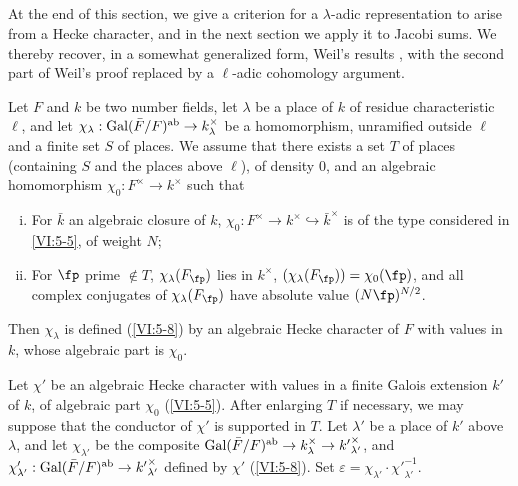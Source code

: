 \subsection{}\label{VI:5-9}

At the end of this section, we give a criterion for a 
$\lambda$-adic representation to arise from a Hecke character, 
and in the next section we apply it to Jacobi sums. We 
thereby recover, in a somewhat generalized form, Weil's results 
\cite{we52,we74-2}, with the second part of Weil's proof 
replaced by a $\ell$-adic cohomology argument. 





\begin{theorem_}\label{VI:5-10}
Let $F$ and $k$ be two number fields, let $\lambda$ be a place of $k$ of 
residue characteristic $\ell$, and let 
$\chi_\lambda:\operatorname{Gal}(\bar F/F)^\textnormal{ab}\to k_\lambda^\times$ be a 
homomorphism, unramified outside $\ell$ and a finite set $S$ of 
places. We assume that there exists a set $T$ of places (containing $S$ and the 
places above $\ell$), of density $0$, and an algebraic homomorphism 
$\chi_0:F^\times \to k^\times$ such that 
\begin{enumerate}[(i)]
  \item For $\bar k$ an algebraic closure of $k$, 
    $\chi_0:F^\times \to k^\times \hookrightarrow \bar k^\times$ is of the type 
    considered in \ref{VI:5-5}, of weight $N$; 
  \item For $\fp$ prime $\notin T$, $\chi_\lambda(F_\fp)$ lies in 
    $k^\times$, $(\chi_\lambda(F_\fp))=\chi_0(\fp)$, and all complex conjugates 
    of $\chi_\lambda(F_\fp)$ have absolute value $(N \fp)^{N/2}$. 
\end{enumerate}

Then $\chi_\lambda$ is defined (\ref{VI:5-8}) by an algebraic Hecke character 
of $F$ with values in $k$, whose algebraic part is $\chi_0$. 
\end{theorem_}

Let $\chi'$ be an algebraic Hecke character with values in a 
finite Galois extension $k'$ of $k$, of algebraic part $\chi_0$ 
(\ref{VI:5-5}). After enlarging $T$ if necessary, we may suppose that the conductor of 
$\chi'$ is supported in $T$. Let $\lambda'$ be a place of $k'$ above 
$\lambda$, and let $\chi_{\lambda'}$ be the composite 
$\operatorname{Gal}(\bar F/F)^\text{ab}\to k_\lambda^\times \to {k'}_{\lambda'}^\times$, and 
$\chi_{\lambda'}':\operatorname{Gal}(\bar F/F)^\text{ab}\to {k'}_{\lambda'}^\times$ defined 
by $\chi'$ (\ref{VI:5-8}). Set 
$\varepsilon = \chi_{\lambda'} \cdot {\chi'}_{\lambda'}^{-1}$.

